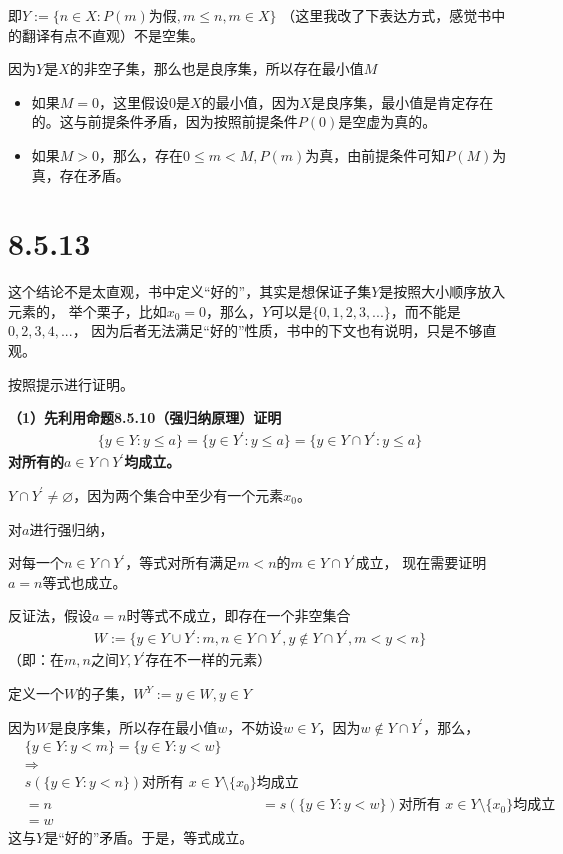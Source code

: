 \documentclass{article}
\begin{document}
即$Y := \{n \in X: P(m) \text{为假},  m \leq n, m \in X  \}$
（这里我改了下表达方式，感觉书中的翻译有点不直观）不是空集。

因为$Y$是$X$的非空子集，那么也是良序集，所以存在最小值$M$

\begin{itemize}
  \item 如果$M = 0$，这里假设$0$是$X$的最小值，因为$X$是良序集，最小值是肯定存在的。这与前提条件矛盾，因为按照前提条件$P(0)$是空虚为真的。
  \item 如果$M > 0$，那么，存在$0 \leq m < M, P(m)$为真，由前提条件可知$P(M)$为真，存在矛盾。
\end{itemize}


\section*{8.5.13}

\begin{zremark}
  这个结论不是太直观，书中定义“好的”，其实是想保证子集$Y$是按照大小顺序放入元素的，
  举个栗子，比如$x_0 = 0$，那么，$Y$可以是$\{0, 1, 2, 3,...\}$，而不能是$0, 2, 3, 4,...$，
  因为后者无法满足“好的”性质，书中的下文也有说明，只是不够直观。
\end{zremark}

按照提示进行证明。

\textbf{（1）先利用命题8.5.10（强归纳原理）证明
  \begin{align*}
    \{y \in Y: y \leq a \} = \{y \in Y^\prime: y \leq a \} = \{y \in Y \cap Y^\prime: y \leq a \}
  \end{align*}
  对所有的$a \in Y \cap Y^\prime$均成立。}

$Y \cap Y^\prime \neq \varnothing$，因为两个集合中至少有一个元素$x_0$。

对$a$进行强归纳，

对每一个$n \in Y \cap Y^\prime$，等式对所有满足$m < n$的$m \in Y \cap Y^\prime$成立，
现在需要证明$a=n$等式也成立。

反证法，假设$a=n$时等式不成立，即存在一个非空集合
\begin{align*}
  W := \{ y \in Y \cup Y^\prime: m,n \in Y \cap Y^\prime,y \not \in Y \cap Y^\prime,  m < y < n \}
\end{align*}
（即：在$m,n$之间$Y,Y^\prime$存在不一样的元素）

定义一个$W$的子集，$W^{Y} := {y \in W, y \in Y}$

因为$W$是良序集，所以存在最小值$w$，不妨设$w \in Y$，因为$w \not \in Y \cap Y^\prime$，那么，
\begin{align*}
   & \{ y \in Y : y < m \} = \{ y \in Y : y < w \}                        \\
   & \Rightarrow                                                          \\
   & s(\{ y \in Y : y < n \}) \text{对所有 $x \in Y \setminus \{x_0\}$均成立}   \\
   & = n

   & = s(\{ y \in Y : y < w \}) \text{对所有 $x \in Y \setminus \{x_0\}$均成立} \\
   & = w
\end{align*}
这与$Y$是“好的”矛盾。于是，等式成立。
\end{document}
